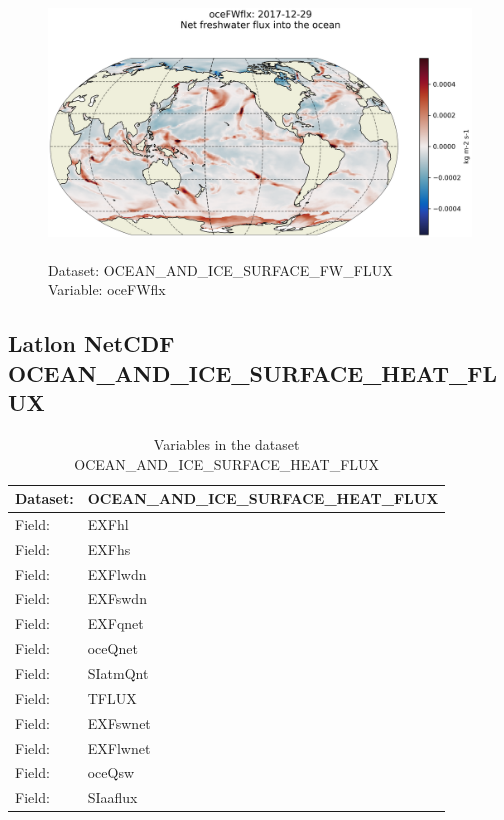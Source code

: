 \begin{figure}[H]
\centering
\includegraphics[scale=0.5]{../images/plots/latlon_plots/Ocean_and_Sea-Ice_Surface_Freshwater_Fluxes/oceFWflx.png}
\caption{\\Dataset: OCEAN\_AND\_ICE\_SURFACE\_FW\_FLUX\\Variable: oceFWflx}
\label{tab:table-OCEAN_AND_ICE_SURFACE_FW_FLUX_oceFWflx-Plot}
\end{figure}
\pagebreak
\subsection{Latlon NetCDF OCEAN\_AND\_ICE\_SURFACE\_HEAT\_FLUX}
\newp
\begin{longtable}{|p{}|p{}|}
\caption{Variables in the dataset OCEAN\_AND\_ICE\_SURFACE\_HEAT\_FLUX}
\label{tab:table-OCEAN_AND_ICE_SURFACE_HEAT_FLUX-fields} \\ 
\hline \endhead \hline \endfoot
\rowcolor{lightgray} \textbf{Dataset:} & \textbf{OCEAN\_AND\_ICE\_SURFACE\_HEAT\_FLUX} \\ \hline
Field: &EXFhl \\ \hline
Field: &EXFhs \\ \hline
Field: &EXFlwdn \\ \hline
Field: &EXFswdn \\ \hline
Field: &EXFqnet \\ \hline
Field: &oceQnet \\ \hline
Field: &SIatmQnt \\ \hline
Field: &TFLUX \\ \hline
Field: &EXFswnet \\ \hline
Field: &EXFlwnet \\ \hline
Field: &oceQsw \\ \hline
Field: &SIaaflux \\ \hline
\end{longtable}

